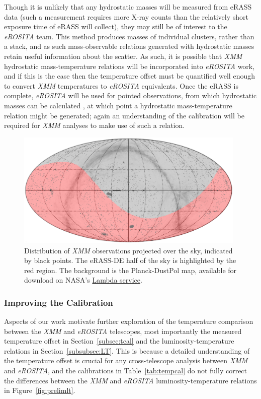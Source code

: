 \documentclass[fleqn,usenatbib]{mnras}
\begin{document}
Though it is unlikely that any hydrostatic masses will be measured from eRASS data (such a measurement requires more X-ray counts than the relatively short exposure time of eRASS will collect), they may still be of interest to the {\em eROSITA} team. This method produces masses of individual clusters, rather than a stack, and as such mass-observable relations generated with hydrostatic masses retain useful information about the scatter. As such, it is possible that {\em XMM} hydrostatic mass-temperature relations will be incorporated into {\em eROSITA} work, and if this is the case then the temperature offset must be quantified well enough to convert {\em XMM} temperatures to {\em eROSITA} equivalents. Once the eRASS is complete, {\em eROSITA} will be used for pointed observations, from which hydrostatic masses can be calculated \citep[][measured the mass of Abell 3266 during {\em eROSITA} commissioning]{pointysanders}, at which point a hydrostatic mass-temperature relation might be generated; again an understanding of the calibration will be required for {\em XMM} analyses to make use of such a relation.

\begin{figure}
    \centering
    \includegraphics[width=0.98\textwidth]{images/XCS_eRASSd.png}
    \caption[]{Distribution of {\em XMM} observations projected over the sky, indicated by black points. The eRASS-DE half of the sky is highlighted by the red region. The background is the Planck-DustPol \citep[][]{dustpol} map, available for download on NASA's \href{http://lambda.gsfc.nasa.gov/data/footprint-maps/Planck_DustPol_Amp_256.fits.gz
}{Lambda service}.} 
    \label{fig:germanerassxmm}
\end{figure}

\subsubsection{Improving the Calibration}
Aspects of our work motivate further exploration of the temperature comparison between the {\em XMM} and {\em eROSITA} telescopes, most importantly the measured temperature offset in Section~\ref{subsec:tcal} and the luminosity-temperature relations in Section~\ref{subsubsec:LT}. This is because a detailed understanding of the temperature offset is crucial for any cross-telescope analysis between {\em XMM} and {\em eROSITA}, and the calibrations in Table~\ref{tab:tempcal} do not fully correct the differences between the {\em XMM} and {\em eROSITA} luminosity-temperature relations in Figure~\ref{fig:prelimlt}.
\end{document}
